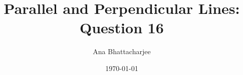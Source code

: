 \documentclass{article}
\begin{document}
\author{Ana Bhattacharjee}
\title{Parallel and Perpendicular Lines: Question 16}
\date{\today}
\maketitle{}
\end{document}
